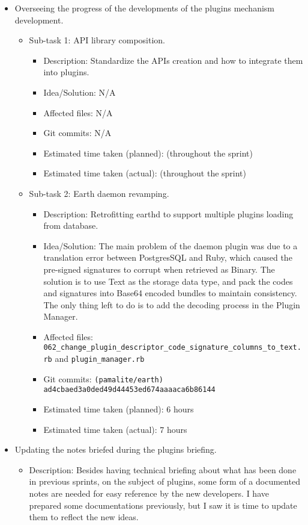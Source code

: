 \documentclass{article}
\begin{document}
\begin{itemize}
	\item Overseeing the progress of the developments of the plugins mechanism development.
	     \begin{itemize}
	        \item Sub-task 1: API library composition.
	           \begin{itemize}
					\item Description: Standardize the APIs creation and how to integrate them into plugins.
					\item Idea/Solution: N/A
					\item Affected files: N/A
					\item Git commits: N/A
					\item Estimated time taken (planned): (throughout the sprint)
					\item Estimated time taken (actual): (throughout the sprint)
				\end{itemize}
			\item Sub-task 2: Earth daemon revamping.
			   \begin{itemize}
					\item Description: Retrofitting earthd to support multiple plugins loading from database. 
					\item Idea/Solution: The main problem of the daemon plugin was due to a translation error between PostgresSQL and Ruby, which caused the pre-signed signatures to corrupt when retrieved as Binary. The solution is to use Text as the storage data type, and pack the codes and signatures into Base64 encoded bundles to maintain consistency. The only thing left to do is to add the decoding process in the Plugin Manager.  
					\item Affected files: \texttt{062\_change\_plugin\_descriptor\_code\_signature\_columns\_to\_text.rb} and \texttt{plugin\_manager.rb}
					\item Git commits: \texttt{(pamalite/earth) ad4cbaed3a0ded49d44453ed674aaaaca6b86144}
					\item Estimated time taken (planned): 6 hours
					\item Estimated time taken (actual): 7 hours
				\end{itemize}
	     \end{itemize}
	\item Updating the notes briefed during the plugins briefing.
	     \begin{itemize}
	         \item Description: Besides having technical briefing about what has been done in previous sprints, on  the subject of plugins, some form of a documented notes are needed for easy reference by the new developers. I have prepared some documentations previously, but I saw it is time to update them to reflect the new ideas.  

\end{itemize}
\end{itemize}
\end{document}
